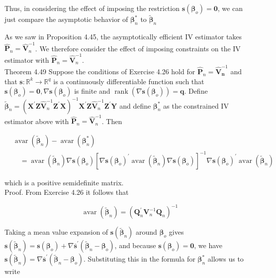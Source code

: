 \documentclass[10pt]{article}
\begin{document}
Thus, in considering the effect of imposing the restriction $\mathbf{s}\left(\boldsymbol{\beta}_{o}\right)=\mathbf{0}$, we can just compare the asymptotic behavior of $\boldsymbol{\beta}_{n}^{*}$ to $\tilde{\boldsymbol{\beta}}_{n}$

As we saw in Proposition 4.45, the asymptotically efficient IV estimator takes $\hat{\mathbf{P}}_{n}=\hat{\mathbf{V}}_{n}^{-1}$. We therefore consider the effect of imposing constraints on the IV estimator with $\hat{\mathbf{P}}_{n}=\hat{\mathbf{V}}_{n}^{-1}$.\\
Theorem 4.49 Suppose the conditions of Exercise 4.26 hold for $\hat{\mathbf{P}}_{n}= \hat{\mathbf{V}}_{\boldsymbol{n}}^{-1}$ and that $\mathbf{s}: \mathbb{R}^{k} \rightarrow \mathbb{R}^{q}$ is a continuously differentiable function such that $\mathbf{s}\left(\boldsymbol{\beta}_{o}\right)=\mathbf{0}, \nabla \mathbf{s}\left(\boldsymbol{\beta}_{o}\right)$ is finite and $\operatorname{rank}\left(\nabla \mathbf{s}\left(\boldsymbol{\beta}_{o}\right)\right)=\boldsymbol{q}$. Define $\tilde{\boldsymbol{\beta}}_{n}= \left(\mathbf{X}^{\prime} \mathbf{Z} \hat{\mathbf{V}}_{n}^{-1} \mathbf{Z}^{\prime} \mathbf{X}\right)^{-1} \mathbf{X}^{\prime} \mathbf{Z} \hat{\mathbf{V}}_{n}^{-1} \mathbf{Z}^{\prime} \mathbf{Y}$ and define $\boldsymbol{\beta}_{n}^{*}$ as the constrained IV estimator above with $\hat{\mathbf{P}}_{n}=\hat{\mathbf{V}}_{n}^{-1}$. Then

$$
\begin{aligned}
& \operatorname{avar}\left(\tilde{\boldsymbol{\beta}}_{n}\right)-\operatorname{avar}\left(\boldsymbol{\beta}_{n}^{*}\right) \\
& \quad=\operatorname{avar}\left(\tilde{\boldsymbol{\beta}}_{n}\right) \nabla \mathbf{s}\left(\boldsymbol{\beta}_{o}\right)\left[\nabla \mathbf{s}\left(\boldsymbol{\beta}_{o}\right)^{\prime} \operatorname{avar}\left(\tilde{\boldsymbol{\beta}}_{n}\right) \nabla \mathbf{s}\left(\boldsymbol{\beta}_{o}\right)\right]^{-1} \nabla \mathbf{s}\left(\boldsymbol{\beta}_{o}\right)^{\prime} \operatorname{avar}\left(\tilde{\boldsymbol{\beta}}_{n}\right)
\end{aligned}
$$

which is a positive semidefinite matrix.\\
Proof. From Exercise 4.26 it follows that

$$
\operatorname{avar}\left(\tilde{\boldsymbol{\beta}}_{n}\right)=\left(\mathbf{Q}_{n}^{\prime} \mathbf{V}_{n}^{-1} \mathbf{Q}_{n}\right)^{-1}
$$

Taking a mean value expansion of $\mathbf{s}\left(\tilde{\boldsymbol{\beta}}_{n}\right)$ around $\boldsymbol{\beta}_{o}$ gives $\mathbf{s}\left(\tilde{\boldsymbol{\beta}}_{n}\right)=\mathbf{s}\left(\boldsymbol{\beta}_{o}\right)+ \nabla \overline{\mathbf{s}}^{\prime}\left(\tilde{\boldsymbol{\beta}}_{n}-\boldsymbol{\beta}_{o}\right)$, and because $\mathbf{s}\left(\boldsymbol{\beta}_{o}\right)=\mathbf{0}$, we have $\mathbf{s}\left(\tilde{\boldsymbol{\beta}}_{n}\right)=\nabla \overline{\mathbf{s}}^{\prime}\left(\tilde{\boldsymbol{\beta}}_{n}-\boldsymbol{\beta}_{o}\right)$. Substituting this in the formula for $\boldsymbol{\beta}_{n}^{*}$ allows us to write
\end{document}
